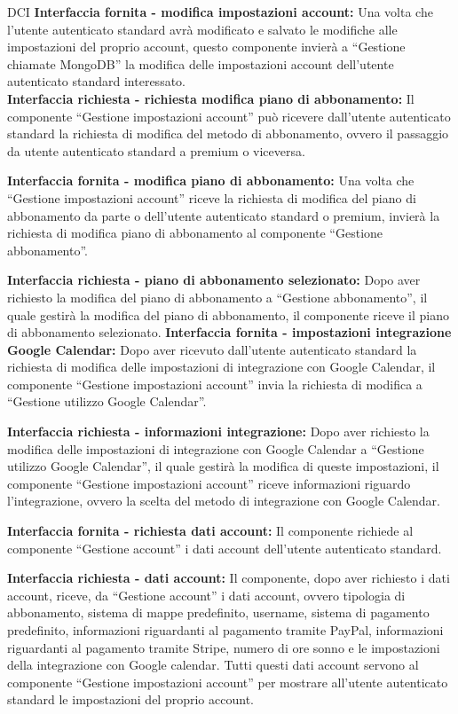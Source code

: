 \begin{listaPersonale}{DCI}
    \textbf{Interfaccia fornita - modifica impostazioni account:} Una volta che l'utente autenticato standard avrà modificato e salvato le modifiche alle impostazioni del proprio account, questo componente invierà a “Gestione chiamate MongoDB” la modifica delle impostazioni account dell'utente autenticato standard interessato. \\
    \textbf{Interfaccia richiesta - richiesta modifica piano di
        abbonamento:} Il componente “Gestione impostazioni account” può ricevere dall'utente autenticato standard la richiesta di modifica del metodo di abbonamento, ovvero il passaggio da utente autenticato standard a premium o viceversa.

    \textbf{Interfaccia fornita - modifica piano di abbonamento:} Una volta che “Gestione impostazioni account” riceve la richiesta di modifica del piano di abbonamento da parte o dell'utente autenticato standard o premium, invierà la richiesta di modifica piano di abbonamento al componente “Gestione abbonamento”.

    \textbf{Interfaccia richiesta - piano di abbonamento selezionato:} Dopo aver richiesto la modifica del piano di abbonamento a “Gestione abbonamento”, il quale gestirà la modifica del piano di abbonamento, il componente riceve il piano di abbonamento selezionato.
    \textbf{Interfaccia fornita - impostazioni integrazione Google
        Calendar:} Dopo aver ricevuto dall'utente autenticato standard la richiesta di modifica delle impostazioni di integrazione con Google Calendar, il componente “Gestione impostazioni account” invia la richiesta di modifica a “Gestione utilizzo Google Calendar”.

    \textbf{Interfaccia richiesta - informazioni integrazione:} Dopo aver richiesto la modifica delle impostazioni di integrazione con Google Calendar a “Gestione utilizzo Google Calendar”, il quale gestirà la modifica di queste impostazioni, il componente “Gestione impostazioni account” riceve informazioni riguardo l'integrazione, ovvero la scelta del metodo di integrazione con Google Calendar.

    \textbf{Interfaccia fornita - richiesta dati account:} Il componente richiede al componente “Gestione account” i dati account dell'utente autenticato standard.

    \textbf{Interfaccia richiesta - dati account:} Il componente, dopo aver richiesto i dati account, riceve, da “Gestione account” i dati account, ovvero tipologia di abbonamento, sistema di mappe predefinito, username, sistema di pagamento predefinito, informazioni riguardanti al pagamento tramite PayPal, informazioni riguardanti al pagamento tramite Stripe, numero di ore sonno e le impostazioni della integrazione con Google calendar. Tutti questi dati account servono al componente “Gestione impostazioni account” per mostrare all'utente autenticato standard le impostazioni del proprio account.



\end{listaPersonale}
